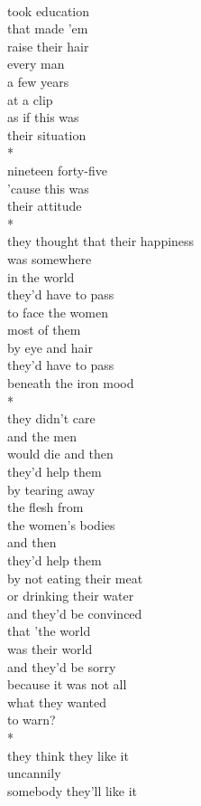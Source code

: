 \documentclass[smalldemyvopaper,11pt,twoside,onecolumn,openright,extrafontsizes]{memoir}
\begin{document}
\\took education
\\that made 'em
\\raise their hair
\\every man
\\a few years
\\at a clip
\\as if this was
\\their situation
\\*
\\nineteen forty-five
\\'cause this was
\\their attitude
\\*
\\they thought that their happiness
\\was somewhere
\\in the world
\\they'd have to pass
\\to face the women
\\most of them
\\by eye and hair
\\they'd have to pass
\\beneath the iron mood
\\*
\\they didn't care
\\and the men
\\would die and then
\\they'd help them
\\by tearing away
\\the flesh from
\\the women's bodies
\\and then
\\they'd help them
\\by not eating their meat
\\or drinking their water
\\and they'd be convinced
\\that 'the world
\\was their world
\\and they'd be sorry
\\because it was not all
\\what they wanted
\\to warn?
\\*
\\they think they like it
\\uncannily
\\somebody they'll like it
\end{document}
